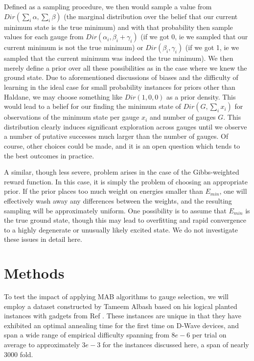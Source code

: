 Defined as a sampling procedure, we then would sample a value from $Dir(\sum_i \alpha,\sum_i \beta)$ (the marginal distribution over the belief that our current minimum state is the true minimum) and with that probability then sample values for each gauge from $Dir(\alpha_i,\beta_i+\gamma_i)$ (if we got 0, ie we sampled that our current minimum is not the true minimum) or $Dir(\beta_i,\gamma_i)$ (if we got 1, ie we sampled that the current minimum was indeed the true minimum). We then merely define a prior over all these possibilities as in the case where we knew the ground state. Due to aforementioned discussions of biases and the difficulty of learning in the ideal case for small probability instances for priors other than Haldane, we may choose something like $Dir(1,0,0)$ as a prior density. This would lead to a belief for our finding the minimum state of $Dir(G,\sum_i x_i)$ for observations of the minimum state per gauge $x_i$ and number of gauges $G$. This distribution clearly induces significant exploration across gauges until we observe a number of putative successes much larger than the number of gauges. Of course, other choices could be made, and it is an open question which tends to the best outcomes in practice.

A similar, though less severe, problem arises in the case of the Gibbs-weighted reward function. In this case, it is simply the problem of choosing an appropriate prior. If the prior places too much weight on energies smaller than $E_{min}$, one will effectively wash away any differences between the weights, and the resulting sampling will be approximately uniform. One possibility is to assume that $E_{min}$ is the true ground state, though this may lead to overfitting and rapid convergence to a highly degenerate or unusually likely excited state. We do not investigate these issues in detail here.

\section{Methods}
To test the impact of applying MAB algorithms to gauge selection, we will employ a dataset constructed by Tameem Albash based on his logical planted instances with gadgets from Ref \cite{albash2018demonstration}. These instances are unique in that they have exhibited an optimal annealing time for the first time on D-Wave devices, and span a wide range of empirical difficulty spanning from $8e-6$ per trial on average to approximately $3e-3$ for the instances discussed here, a span of nearly $3000$ fold.

